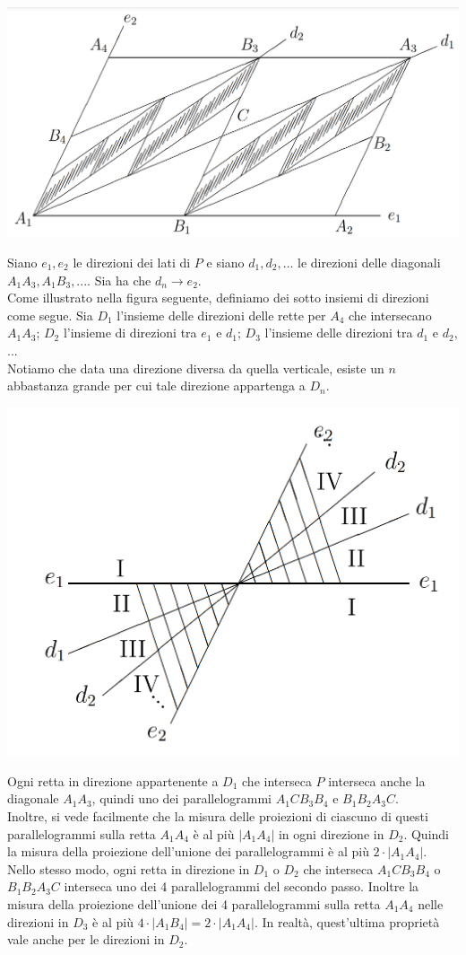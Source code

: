 \documentclass[a4paper, twoside,openright]{article}
\newcommand{\<}{\langle}
\renewcommand{\>}{\rangle}
\begin{document}
\begin{center}
	\includegraphics[width=0.7\columnwidth]{passi123.png}
\end{center}

Siano $e_{1}, e_{2}$ le direzioni dei lati di $P$ e siano $d_{1}, d_{2}, \ldots$ le direzioni delle diagonali $A_{1} A_{3}, A_{1} B_{3},...$. Sia ha che $d_{n} \rightarrow e_{2}$.\\
Come illustrato nella figura seguente, definiamo dei sotto insiemi di direzioni come segue. Sia $D_1$ l'insieme delle direzioni delle rette per $A_{4}$ che intersecano $A_{1} A_{3}$; $D_2$ l'insieme di direzioni tra $e_{1}$ e $d_{1}$; $D_3$ l'insieme delle direzioni tra $d_{1}$ e $d_{2}$, ...\\
Notiamo che data una direzione diversa da quella verticale, esiste un $n$ abbastanza grande per cui tale direzione appartenga a $D_n$.

\begin{center}
	\includegraphics[width=0.6\columnwidth]{direzioni.png}
\end{center}

Ogni retta in direzione appartenente a $D_1$ che interseca $P$ interseca anche la diagonale $A_{1} A_{3}$, quindi uno dei parallelogrammi $A_{1} C B_{3} B_{4}$ e $B_{1} B_{2} A_{3} C$.\\
Inoltre, si vede facilmente che la misura delle proiezioni di ciascuno di questi parallelogrammi sulla retta $A_{1} A_{4}$ è al più $\left|A_{1} A_{4}\right|$ in ogni direzione in $D_2$. Quindi la misura della proiezione dell'unione dei parallelogrammi è al più $2 \cdot\left|A_{1} A_{4}\right|$.\\
Nello stesso modo, ogni retta in direzione in $D_1$ o $D_2$ che interseca $A_{1} C B_{3} B_{4}$ o $B_{1} B_{2} A_{3} C$ interseca uno dei 4 parallelogrammi del secondo passo. Inoltre la misura della proiezione dell'unione dei 4 parallelogrammi sulla retta $A_{1} A_{4}$ nelle direzioni in $D_3$ è al più $4 \cdot\left|A_{1} B_{4}\right|=2 \cdot\left|A_{1} A_{4}\right|$. In realtà, quest'ultima proprietà vale anche per le direzioni in $D_2$.\\
\end{document}
